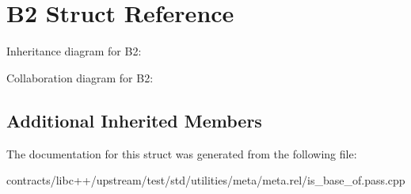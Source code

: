 \hypertarget{struct_b2}{}\section{B2 Struct Reference}
\label{struct_b2}


Inheritance diagram for B2\+:


Collaboration diagram for B2\+:
\subsection*{Additional Inherited Members}


The documentation for this struct was generated from the following file\+:\begin{DoxyCompactItemize}
\item 
contracts/libc++/upstream/test/std/utilities/meta/meta.\+rel/is\+\_\+base\+\_\+of.\+pass.\+cpp\end{DoxyCompactItemize}
